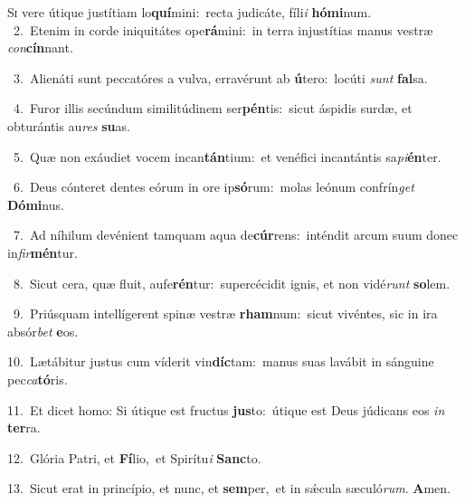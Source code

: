 \lettrine{\initial\textcolor{\initialcolor}{S}}{i} vere útique justítiam lo\-\textbf{quí}\-mini:~\star recta judicáte, fíli\textit{i} \textbf{hó}\-\textbf{mi}num.\\
{\numbfont\textcolor{\numbcolor}{~2.}}~Etenim in corde iniquitátes ope\-\textbf{rá}\-mini:~\star in terra injustítias manus vestræ \textit{con}\-\textbf{cín}nant.\par
{\numbfont\textcolor{\numbcolor}{~3.}}~Alienáti sunt peccatóres a vulva, erravérunt ab \textbf{ú}\-tero:~\star locúti \textit{sunt} \textbf{fal}\-sa.\par
{\numbfont\textcolor{\numbcolor}{~4.}}~Furor illis secúndum similitúdinem ser\-\textbf{pén}\-tis:~\star sicut áspidis surdæ, et obturántis au\textit{res} \textbf{su}\-as.\par
{\numbfont\textcolor{\numbcolor}{~5.}}~Quæ non exáudiet vocem incan\-\textbf{tán}\-tium:~\star et venéfici incantántis sa\-\textit{pi}\-\textbf{én}ter.\par
{\numbfont\textcolor{\numbcolor}{~6.}}~Deus cónteret dentes eórum in ore ip\-\textbf{só}\-rum:~\star molas leónum confrín\textit{get} \textbf{Dó}\-\textbf{mi}nus.\par
{\numbfont\textcolor{\numbcolor}{~7.}}~Ad níhilum devénient tamquam aqua de\-\textbf{cúr}\-rens:~\star inténdit arcum suum donec in\-\textit{fir}\-\textbf{mén}tur.\par
{\numbfont\textcolor{\numbcolor}{~8.}}~Sicut cera, quæ fluit, aufe\-\textbf{rén}\-tur:~\star supercécidit ignis, et non vidé\textit{runt} \textbf{so}\-lem.\par
{\numbfont\textcolor{\numbcolor}{~9.}}~Priúsquam intellígerent spinæ vestræ \textbf{rham}\-num:~\star sicut vivéntes, sic in ira absór\textit{bet} \textbf{e}\-os.\par
{\numbfont\textcolor{\numbcolor}{10.}}~Lætábitur justus cum víderit vin\-\textbf{díc}\-tam:~\star manus suas lavábit in sánguine pec\-\textit{ca}\-\textbf{tó}ris.\par
{\numbfont\textcolor{\numbcolor}{11.}}~Et dicet homo: Si útique est fructus \textbf{jus}\-to:~\star útique est Deus júdicans eos \textit{in} \textbf{ter}\-ra.\par
{\numbfont\textcolor{\numbcolor}{12.}}~Glória Patri, et \textbf{Fí}\-lio,~\star et Spirítu\textit{i} \textbf{Sanc}\-to.\par
{\numbfont\textcolor{\numbcolor}{13.}}~Sicut erat in princípio, et nunc, et \textbf{sem}\-per,~\star et in sǽcula sæculó\-\textit{rum}\-. \textbf{A}\-men.\par
